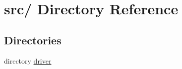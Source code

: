 \hypertarget{dir_000002}{
\section{src/ Directory Reference}
\label{dir_000002}
}
\subsection*{Directories}
\begin{CompactItemize}
\item 
directory \hyperlink{dir_000003}{driver}
\end{CompactItemize}
